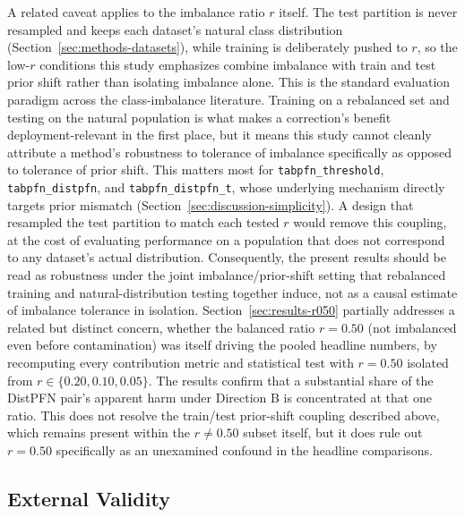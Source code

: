 A related caveat applies to the imbalance ratio $r$ itself. The test
partition is never resampled and keeps each dataset's natural class
distribution (Section~\ref{sec:methods-datasets}), while training is
deliberately pushed to $r$, so the low-$r$ conditions this study
emphasizes combine imbalance with train and test prior shift rather than
isolating imbalance alone. This is the standard evaluation paradigm
across the class-imbalance literature. Training on a rebalanced set and
testing on the natural population is what makes a correction's benefit
deployment-relevant in the first place, but it means this study cannot
cleanly attribute a method's robustness to tolerance of imbalance
specifically as opposed to tolerance of prior shift. This matters most
for \texttt{tabpfn\_threshold}, \texttt{tabpfn\_distpfn}, and
\texttt{tabpfn\_distpfn\_t}, whose underlying mechanism directly targets
prior mismatch (Section~\ref{sec:discussion-simplicity}). A design that
resampled the test partition to match each tested $r$ would remove this
coupling, at the cost of evaluating performance on a population that
does not correspond to any dataset's actual distribution. Consequently,
the present results should be read as robustness under the joint
imbalance/prior-shift setting that rebalanced training and
natural-distribution testing together induce, not as a causal estimate
of imbalance tolerance in isolation.
Section~\ref{sec:results-r050} partially addresses a related but distinct
concern, whether the balanced ratio $r{=}0.50$ (not imbalanced even
before contamination) was itself driving the pooled headline numbers, by
recomputing every contribution metric and statistical test with
$r{=}0.50$ isolated from $r \in \{0.20, 0.10, 0.05\}$. The results
confirm that a substantial share of the DistPFN pair's apparent harm
under Direction B is concentrated at that one ratio. This does not
resolve the train/test prior-shift coupling described above, which
remains present within the $r{\neq}0.50$ subset itself, but it does rule
out $r{=}0.50$ specifically as an unexamined confound in the headline
comparisons.

\subsection{External Validity}
\label{sec:threats-external}

